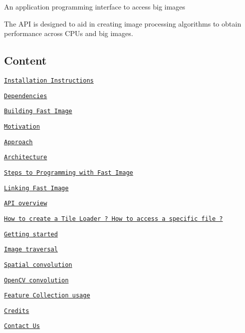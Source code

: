 An application programming interface to access big images

The A\+PI is designed to aid in creating image processing algorithms to obtain performance across C\+P\+Us and big images.

\subsection*{Content}


\begin{DoxyItemize}
\item \href{#installation-instructions}{\tt Installation Instructions}
\begin{DoxyItemize}
\item \href{#dependencies}{\tt Dependencies}
\item \href{#building-fast-image}{\tt Building Fast Image}
\end{DoxyItemize}
\item \href{#motivation}{\tt Motivation}
\item \href{#approach}{\tt Approach}
\item \href{#architecture}{\tt Architecture}
\item \href{#steps-to-programming-with-fast-image}{\tt Steps to Programming with Fast Image}
\begin{DoxyItemize}
\item \href{#linking-_fast-image_}{\tt Linking Fast Image}
\item \href{#api-overview}{\tt A\+PI overview}
\item \href{#how-to-create-a-tile-loader-how-to-access-a-specific-file-}{\tt How to create a Tile Loader ? How to access a specific file ?}
\item \href{#getting-started}{\tt Getting started}
\begin{DoxyItemize}
\item \href{#image-traversal}{\tt Image traversal}
\item \href{#spatial-convolution}{\tt Spatial convolution}
\item \href{#opencv-convolution}{\tt Open\+CV convolution}
\item \href{#feature-collection-usage}{\tt Feature Collection usage}
\end{DoxyItemize}
\end{DoxyItemize}
\item \href{#credits}{\tt Credits}
\item \href{#contact-us}{\tt Contact Us}
\end{DoxyItemize}

